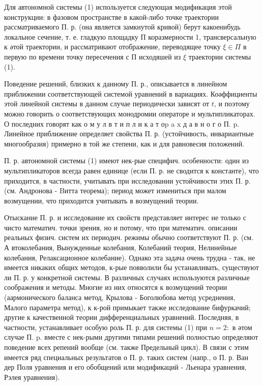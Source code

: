 \documentclass[10pt]{article}
\begin{document}
Для автономной системы (1) используется следующая модификация этой конструкции: в фазовом пространстве в какой-либо точке траектории рассматриваемого П. р. (она является замкнутой кривой) берут какоенибудь локальное сечение, т. е. гладкую площадку П коразмерности 1, трансверсальную к әтой траектории, и рассматривают отображение, переводящее точку $\xi \in \Pi$ в первую по времени точку пересечения с П исходяшей из $\xi$ траектории системы (1).



Поведение решений, близких к данному П. р., описывается в линейном приближении соответствующей системой уравнений в вариациях. Коәффициенты этой линейной системы в данном случае периодически зависят от $t$, и поэтому можно говорить о соответствующих монодромии операторе и мультипликаторах. О последних говорят как о м у л в т и п л и к а т оp a x д а в н о г о П. p. Линейное приближение определяет свойства П. р. (устойчивость, инвариантные многообразия) примерно в той же степени, как и для равновесия положений.



П. р. автономной системы (1) имеют нек-рые специфич. особенности: один из мультипликаторов всегда равен единице (если П. р. не сводится к константе), что приходится, в частности, учитывать при исследовании устойчивости этих П. р. (см. Андронова - Bитта теорема); период может измениться при малом возмущении, что приходится учитывать в возмущений теории.



Отыскание П. р. и исследование их свойств представляет интерес не только с чисто математич. точки зрения, но и потому, что при математич. описании реальных физич. систем их периодич. режимы обычно соответствуют П. р. (см. А втоколебания, Вынужденные колебания, Колебаний теория, Нелинейные колебания, Релаксационное колебание). Однако эта задача очень трудна - так, не имеется никаких общих методов, к-рые повволили бы устанавливать, существуют ли П. р. у конкретной системы. В различных случаях используются различные соображения и методы. Многие из них относятся к возмущений теории (аармонического баланса метод, Крылова - Боголюбова метод усреднения, Малого параметра метод), к к-рой примыкает также исследование бифуркачий; другие к качественной теории дифференциальных уравнений. Последняя, в частности, устанавливает особую роль П. р. для системы (1) при $n=2:$ в әтом случае П. p. вместе с нек-рыми другими типами решений полностью определяют поведение всех репений вообще (см. также Предельный цикл). В связи с этим имеется ряд специальных результатов о П. р. таких систем (напр., о П. р. Ван дер Поля уравнения и его обобщений или модификаций - Льенара уравнения, Рэлея уравнения).
\end{document}
